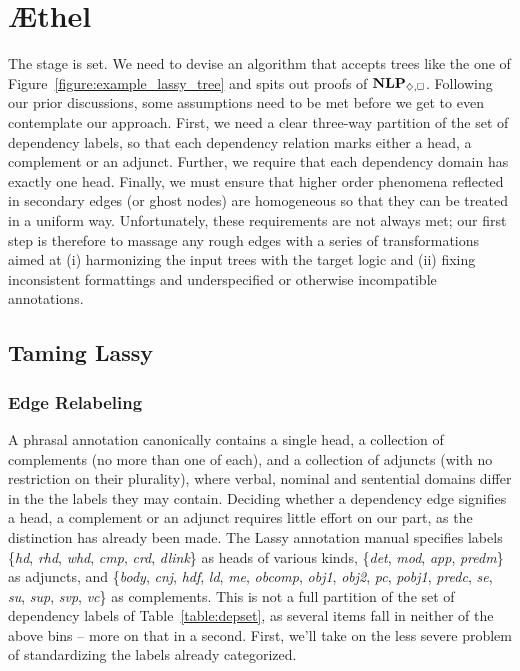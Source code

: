 \section{\AE thel}
The stage is set.
We need to devise an algorithm that accepts trees like the one of Figure~\ref{figure:example_lassy_tree} and spits out proofs of $\NLP_{\diamond,\bx}$.
Following our prior discussions, some assumptions need to be met before we get to even contemplate our approach.
First, we need a clear three-way partition of the set of dependency labels, so that each dependency relation marks either a head, a complement or an adjunct.
Further, we require that each dependency domain has exactly one head.
Finally, we must ensure that higher order phenomena reflected in secondary edges (or ghost nodes) are homogeneous so that they can be treated in a uniform way.
Unfortunately, these requirements are not always met; our first step is therefore to massage any rough edges with a series of transformations aimed at (i) harmonizing the input trees with the target logic and (ii) fixing inconsistent formattings and underspecified or otherwise incompatible annotations. 

\subsection{Taming Lassy}
\subsubsection{Edge Relabeling}
A phrasal annotation canonically contains a single head, a collection of complements (no more than one of each), and a collection of adjuncts (with no restriction on their plurality), where verbal, nominal and sentential domains differ in the the labels they may contain.
Deciding whether a dependency edge signifies a head, a complement or an adjunct requires little effort on our part, as the distinction has already been made.
The Lassy annotation manual specifies labels \{\textit{hd}, \textit{rhd}, \textit{whd}, \textit{cmp}, \textit{crd}, \textit{dlink}\} as heads of various kinds, \{\textit{det}, \textit{mod}, \textit{app}, \textit{predm}\} as adjuncts, and \{\textit{body}, \textit{cnj}, \textit{hdf}, \textit{ld}, \textit{me}, \textit{obcomp}, \textit{obj1}, \textit{obj2}, \textit{pc}, \textit{pobj1}, \textit{predc}, \textit{se}, \textit{su}, \textit{sup}, \textit{svp}, \textit{vc}\} as complements.
This is not a full partition of the set of dependency labels of Table~\ref{table:depset}, as several items fall in neither of the above bins -- more on that in a second.
First, we'll take on the less severe problem of standardizing the labels already categorized.

